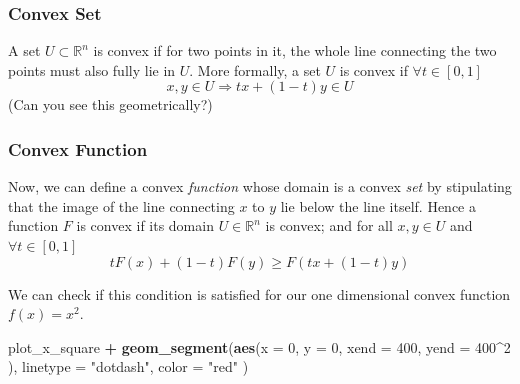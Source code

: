 \documentclass[11pt,]{article}
\newenvironment{Shaded}{\begin{snugshade}}{\end{snugshade}}
\newcommand{\KeywordTok}[1]{\textcolor[rgb]{0.13,0.29,0.53}{\textbf{#1}}}
\newcommand{\DataTypeTok}[1]{\textcolor[rgb]{0.13,0.29,0.53}{#1}}
\newcommand{\DecValTok}[1]{\textcolor[rgb]{0.00,0.00,0.81}{#1}}
\newcommand{\StringTok}[1]{\textcolor[rgb]{0.31,0.60,0.02}{#1}}
\newcommand{\OperatorTok}[1]{\textcolor[rgb]{0.81,0.36,0.00}{\textbf{#1}}}
\newcommand{\NormalTok}[1]{#1}
\begin{document}
\subsubsection{Convex Set}\label{convex-set}

A set \(U\subset \mathbb{R}^n\) is convex if for two points in it, the
whole line connecting the two points must also fully lie in \(U\). More
formally, a set \(U\) is convex if \(\forall t\in[0,1]\) \[
x, y \in U \Rightarrow tx+(1-t)y\in U
\] (Can you see this geometrically?)

\subsubsection{Convex Function}\label{convex-function}

Now, we can define a convex \emph{function} whose domain is a convex
\emph{set} by stipulating that the image of the line connecting \(x\) to
\(y\) lie below the line itself. Hence a function \(F\) is convex if its
domain \(U\in \mathbb{R}^n\) is convex; and for all \(x, y\in U\) and
\(\forall t\in[0,1]\) \[
tF(x) + (1-t)F(y) \geq F(tx + (1-t)y)
\]

We can check if this condition is satisfied for our one dimensional
convex function \(f(x)=x^2\).

\begin{Shaded}
\begin{Highlighting}[]
\NormalTok{plot_x_square }\OperatorTok{+}\StringTok{ }
\StringTok{  }\KeywordTok{geom_segment}\NormalTok{(}\KeywordTok{aes}\NormalTok{(}\DataTypeTok{x =} \DecValTok{0}\NormalTok{, }
                   \DataTypeTok{y =} \DecValTok{0}\NormalTok{, }
                   \DataTypeTok{xend =} \DecValTok{400}\NormalTok{, }
                   \DataTypeTok{yend =} \DecValTok{400}\OperatorTok{^}\DecValTok{2}
\NormalTok{                   ), }
               \DataTypeTok{linetype =} \StringTok{"dotdash"}\NormalTok{, }
               \DataTypeTok{color =} \StringTok{"red"}
\NormalTok{               )}
\end{Highlighting}
\end{Shaded}
\end{document}
